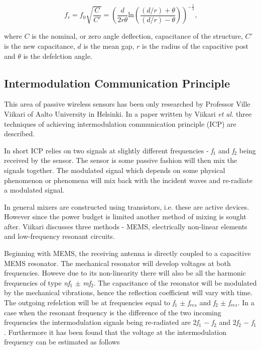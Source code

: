 \documentclass[11pt,a4paper]{article}
\begin{document}
\begin{equation}
f_r = f_0\sqrt{\frac{C}{C'}} = \left(\frac{d}{2r\theta}\textrm{ln}\left(\frac{(d/r)+\theta}{(d/r)-\theta}\right)\right)^{-\frac{1}{2}}\textrm{,}
\end{equation}

where $C$ is the nominal, or zero angle deflection, capacitance of the structure, $C'$ is the new capacitance, $d$ is the mean gap, $r$ is the radius of the capacitive post and $\theta$ is the defelction angle.

\subsection{Intermodulation Communication Principle}

This area of passive wireless sensors has been only researched by Professor Ville Viikari of Aalto University in Helsinki. In a paper written by Viikari \textit{et al.}\cite{imc_review} three techniques of achieving intermodulation communication principle (ICP) are described.

In short ICP relies on two signals at slightly different frequencies - \textit{f}$_1$ and \textit{f}$_2$ being received by the sensor. The sensor is some passive fashion will then mix the signals together. The modulated signal which depends on some physical phenomenon or phenomena will mix back with the incident waves and re-radiate a modulated signal.

In general mixers are constructed using transistors, i.e. these are active devices. However since the power budget is limited another method of mixing is sought after. Viikari discusses three methods - MEMS, electrically non-linear elements and low-frequency resonant circuits.

Beginning with MEMS, the receiving antenna is directly coupled to a capacitive MEMS resonator. The mechanical resonator will develop voltages at both frequencies. Howeve due to its non-linearity there will also be all the harmonic frequencies of type \textit{nf}$_1$ $\pm$ \textit{mf}$_2$. The capacitance of the resonator will be modulated by the mechanical vibrations, hence the reflection coefficient will vary with time. The outgoing refelction will be at frequencies equal to \textit{f}$_1$ $\pm$ \textit{f}$_{res}$ and \textit{f}$_2$ $\pm$ \textit{f}$_{res}$. In a case when the resonant frequency is the difference of the two incoming frequencies the intermodulation signals being re-radiated are 2\textit{f}$_1$ $-$ \textit{f}$_2$ and 2\textit{f}$_2$ $-$ \textit{f}$_1$. Furthermore it has been found that the voltage at the intermodulation frequency can be estimated as follows \cite{rfidMEMS}
\end{document}
